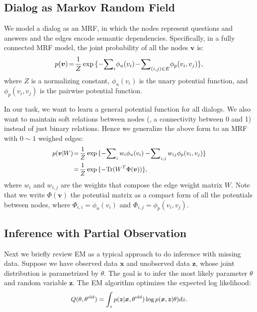 \documentclass[10pt,twocolumn,letterpaper]{article}
\DeclareMathOperator{\Tr}{Tr}
\begin{document}
\subsection{Dialog as Markov Random Field}
We model a dialog as an MRF, in which the nodes represent questions and answers and the edges encode semantic dependencies. Specifically, in a fully connected MRF model, the joint probability of all the nodes $\bm{v}$ is:
\vspace{-2pt}
\begin{equation}\small
\!\!p(\bm{v})\!=\!\frac{1}{Z}\exp{\{-\!\sum\nolimits_{i} \!\phi_{u}(v_i)\!-\!\sum\nolimits_{(i, j)\in E} \!\phi_p(v_i, v_j)\}},\!\!
\vspace{-2pt}
\end{equation}
where $Z$ is a normalizing constant, $\phi_{u}(v_i)$ is the unary potential function, and $\phi_p(v_i, v_j)$ is the pairwise potential function.

In our task, we want to learn a general potential function for all dialogs. We also want to maintain soft relations between nodes (\ie, a connectivity between 0 and 1) instead of just binary relations. Hence we generalize the above form to an MRF with $0 \sim 1$ weighed edges:
\vspace{-2pt}
\begin{equation}\small
\begin{aligned}
\!\!\!\!p(\bm{v} | W)&\!=\!\frac{1}{Z}\exp{\{-\!\sum\nolimits_{i} w_i \phi_{u}(v_i) - \!\sum\nolimits_{i, j} w_{ij} \phi_p(v_i, v_j)\}}\!\!\!\!\\
&\!=\! \frac{1}{Z}\exp{\{ - \!\Tr(W^T \Phi(\bm{v}))  \}},
\end{aligned}
\vspace{-2pt}
\end{equation}
where $w_i$ and $w_{i, j}$ are the weights that compose the edge weight matrix $W$. Note that we write $\Phi(\bm{v})$ the potential matrix as a compact form of all the potentials between nodes, where $\Phi_{i, i} = \phi_u(v_i)$ and $\Phi_{i, j} = \phi_p(v_i, v_j)$.

\subsection{Inference with Partial Observation}
Next we briefly review EM as a typical approach to do inference with missing data.
Suppose we have observed data $\bm{x}$ and unobserved data $\bm{z}$, whose joint distribution is parametrized by $\theta$. The goal is to infer the most likely parameter $\theta$ and random variable $\bm{z}$. The EM algorithm optimizes the expected log likelihood:
\vspace{-2pt}
\begin{equation}\small
\begin{aligned}
Q(\theta, \theta^{\text{old}}) = \int_z p(\bm{z} | \bm{x}, \theta^{\text{old}}) \log p(\bm{x}, \bm{z} | \theta) dz.
\end{aligned}
\label{eqn:expected_log_likelihood}
\vspace{-2pt}
\end{equation}
\end{document}
